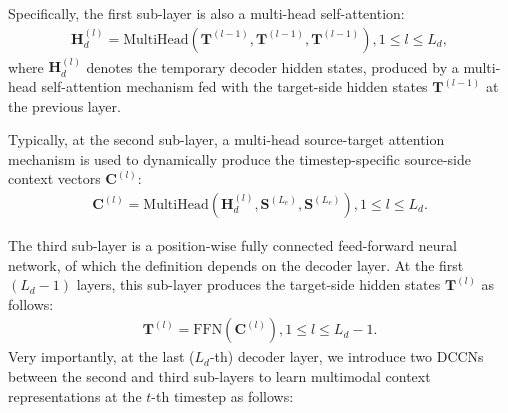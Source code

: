 \documentclass[sigconf]{acmart}
\begin{document}
Specifically, 
the first sub-layer is also a multi-head self-attention:
\begin{align}
\mathbf{H}^{(l)}_d = \mathrm{MultiHead}(\mathbf{T}^{(l-1)}, \mathbf{T}^{(l-1)}, \mathbf{T}^{(l-1)}), 1\leq{l}\leq{L_d},
\end{align}
where $\mathbf{H}^{(l)}_d$ denotes the temporary decoder hidden states, produced by a multi-head self-attention mechanism fed with the target-side hidden states $\mathbf{T}^{(l-1)}$ at the previous layer.

Typically,
at the second sub-layer,
a multi-head source-target attention mechanism is used to dynamically produce the timestep-specific source-side context vectors $\mathbf{C}^{(l)}$:
\begin{align}
\mathbf{C}^{(l)} = \mathrm{MultiHead}(\mathbf{H}^{(l)}_d, \mathbf{S}^{(L_{e})}, \mathbf{S}^{(L_{e})}), 1\leq{l}\leq{L_d}.
\end{align}


The third sub-layer is 
a position-wise fully connected feed-forward neural network, of which the definition depends on the decoder layer. At the first $(L_d-1)$ layers, this sub-layer produces the target-side hidden states $\mathbf{T}^{(l)}$ as follows:
\begin{align}
\mathbf{T}^{(l)} = \mathrm{FFN}(\mathbf{C}^{(l)}), 1\leq{l}\leq{L_d}-1. \label{equ_ffn}
\end{align}
Very importantly, at the last ($L_d$-th) decoder layer, 
we introduce two DCCNs between the second and third sub-layers to  learn multimodal context representations at the $t$-th timestep as follows: 
\end{document}
